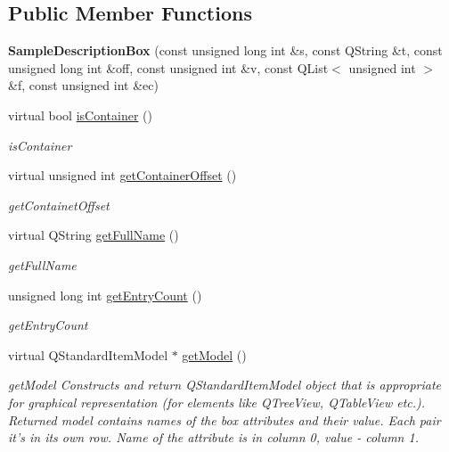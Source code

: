 \subsection*{Public Member Functions}
\begin{DoxyCompactItemize}
\item 
\hypertarget{class_sample_description_box_a14cef4a77ad120c33acfc39342a7d648}{{\bfseries Sample\-Description\-Box} (const unsigned long int \&s, const Q\-String \&t, const unsigned long int \&off, const unsigned int \&v, const Q\-List$<$ unsigned int $>$ \&f, const unsigned int \&ec)}\label{class_sample_description_box_a14cef4a77ad120c33acfc39342a7d648}

\item 
virtual bool \hyperlink{class_sample_description_box_a227a7ad2f2d282a14cdbbed065fecfa5}{is\-Container} ()
\begin{DoxyCompactList}\small\item\em is\-Container \end{DoxyCompactList}\item 
virtual unsigned int \hyperlink{class_sample_description_box_af2fa7d915484805e19abf46f40e906f6}{get\-Container\-Offset} ()
\begin{DoxyCompactList}\small\item\em get\-Containet\-Offset \end{DoxyCompactList}\item 
virtual Q\-String \hyperlink{class_sample_description_box_a47754fb62da6522d13ff58de1ede0f09}{get\-Full\-Name} ()
\begin{DoxyCompactList}\small\item\em get\-Full\-Name \end{DoxyCompactList}\item 
unsigned long int \hyperlink{class_sample_description_box_a2581cd57076984fef7051c792eff1b50}{get\-Entry\-Count} ()
\begin{DoxyCompactList}\small\item\em get\-Entry\-Count \end{DoxyCompactList}\item 
virtual Q\-Standard\-Item\-Model $\ast$ \hyperlink{class_sample_description_box_ae00adf8e73a8480b7299a88d9d65d88a}{get\-Model} ()
\begin{DoxyCompactList}\small\item\em get\-Model Constructs and return Q\-Standard\-Item\-Model object that is appropriate for graphical representation (for elements like Q\-Tree\-View, Q\-Table\-View etc.). Returned model contains names of the box attributes and their value. Each pair it's in its own row. Name of the attribute is in column 0, value -\/ column 1. \end{DoxyCompactList}\end{DoxyCompactItemize}
